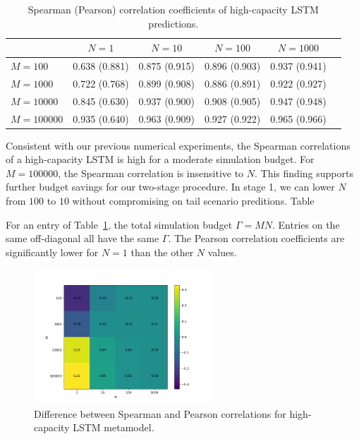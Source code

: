 \begin{table}[ht!]
    \small
    \centering
    \begin{tabular}{lccccc}
        \toprule
                           & $N=\num{1}$   & $N=\num{10}$  & $N=\num{100}$ & $N=\num{1000}$ \\
        \midrule
        $M = \num{100}$    & 0.638 (0.881) & 0.875 (0.915) & 0.896 (0.903) & 0.937 (0.941) \\
        $M = \num{1000}$   & 0.722 (0.768) & 0.899 (0.908) & 0.886 (0.891) & 0.922 (0.927) \\
        $M = \num{10000}$  & 0.845 (0.630) & 0.937 (0.900) & 0.908 (0.905) & 0.947 (0.948) \\
        $M = \num{100000}$ & 0.935 (0.640) & 0.963 (0.909) & 0.927 (0.922) & 0.965 (0.966) \\
        \bottomrule
    \end{tabular}
    \caption{Spearman (Pearson) correlation coefficients of high-capacity LSTM predictions.}
    \label{tab2:lstm_corr}
\end{table}

Consistent with our previous numerical experiments, the Spearman correlations of a high-capacity LSTM is high for a moderate simulation budget. 
For $M= \num{100000}$, the Spearman correlation is insensitive to $N$.
This finding supports further budget savings for our two-stage procedure.
In stage 1, we can lower $N$ from $\num{100}$ to $\num{10}$ without compromising on tail scenario preditions. 
Table

For an entry of Table~\ref{tab2:lstm_corr}, the total simulation budget $\Gamma = M N$. 
Entries on the same off-diagonal all have the same $\Gamma$.
The Pearson correlation coefficients are significantly lower for $N=\num{1}$ than the other $N$ values.

\begin{figure}
    \centering
    \includegraphics[width=0.6\textwidth]{./project2/figures/cor_heatmap.png}
    \caption{Difference between Spearman and Pearson correlations for high-capacity LSTM metamodel.}
    \label{fig2:cor-heatmap}
\end{figure}

